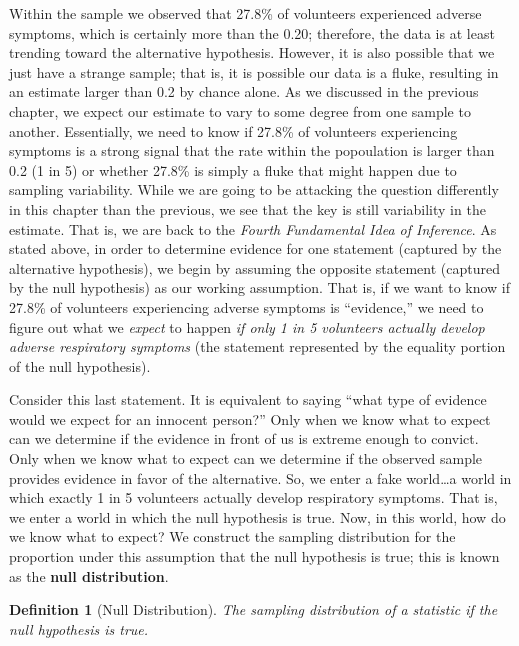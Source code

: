 \documentclass[
]{book}
\theoremstyle{plain}
\theoremstyle{mydefn}
\newtheorem{definition}{Definition}[chapter]
\theoremstyle{myexmpl}
\theoremstyle{remark}
\begin{document}
Within the sample we observed that 27.8\% of volunteers experienced adverse symptoms, which is certainly more than the 0.20; therefore, the data is at least trending toward the alternative hypothesis. However, it is also possible that we just have a strange sample; that is, it is possible our data is a fluke, resulting in an estimate larger than 0.2 by chance alone. As we discussed in the previous chapter, we expect our estimate to vary to some degree from one sample to another. Essentially, we need to know if 27.8\% of volunteers experiencing symptoms is a strong signal that the rate within the popoulation is larger than 0.2 (1 in 5) or whether 27.8\% is simply a fluke that might happen due to sampling variability. While we are going to be attacking the question differently in this chapter than the previous, we see that the key is still variability in the estimate. That is, we are back to the \emph{Fourth Fundamental Idea of Inference}. As stated above, in order to determine evidence for one statement (captured by the alternative hypothesis), we begin by assuming the opposite statement (captured by the null hypothesis) as our working assumption. That is, if we want to know if 27.8\% of volunteers experiencing adverse symptoms is ``evidence,'' we need to figure out what we \emph{expect} to happen \emph{if only 1 in 5 volunteers actually develop adverse respiratory symptoms} (the statement represented by the equality portion of the null hypothesis).

Consider this last statement. It is equivalent to saying ``what type of evidence would we expect for an innocent person?'' Only when we know what to expect can we determine if the evidence in front of us is extreme enough to convict. Only when we know what to expect can we determine if the observed sample provides evidence in favor of the alternative. So, we enter a fake world\ldots a world in which exactly 1 in 5 volunteers actually develop respiratory symptoms. That is, we enter a world in which the null hypothesis is true. Now, in this world, how do we know what to expect? We construct the sampling distribution for the proportion under this assumption that the null hypothesis is true; this is known as the \textbf{null distribution}.

\begin{definition}[Null Distribution]
\protect\hypertarget{def:defn-null-distribution}{}{\label{def:defn-null-distribution} {} }The sampling distribution of a statistic \emph{if} the null hypothesis is true.
\end{definition}
\end{document}
